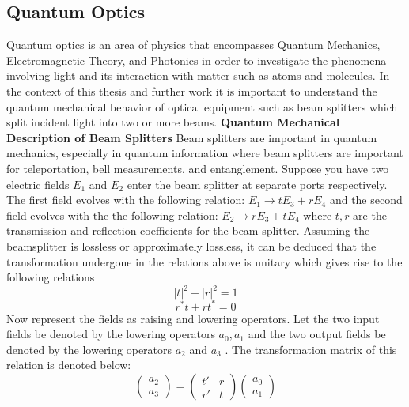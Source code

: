 \subsection{Quantum Optics}
Quantum optics is an area of physics that encompasses Quantum Mechanics, Electromagnetic Theory, and Photonics in order to investigate the phenomena involving light and its interaction with matter such as atoms and molecules. In the context of this thesis and further work it is important to understand the quantum mechanical behavior of optical equipment such as beam splitters which split incident light into two or more beams. \newline
\textbf{Quantum Mechanical Description of Beam Splitters} \newline
Beam splitters are important in quantum mechanics, especially in quantum information where beam splitters are important for teleportation, bell measurements, and entanglement. \newline
Suppose you have two electric fields $E_{1}$ and $E_{2}$ enter the beam splitter at separate ports respectively. The first field evolves with the following relation: $E_{1} \rightarrow tE_3 + rE_4$ and the second field evolves with the the following relation: $E_2 \rightarrow rE_3 + tE_4$ where $t,r$ are the transmission and reflection coefficients for the beam splitter. \newline \newline
Assuming the beamsplitter is lossless or approximately lossless, it can be deduced that the transformation undergone in the relations above is unitary which gives rise to the following relations
\begin{equation}
    |t|^2 + |r|^2 = 1
\end{equation}
\begin{equation}
    r^{*}t + rt^{*} = 0
\end{equation} 
Now represent the fields as raising and lowering operators. Let the two input fields be denoted by the lowering operators $a_{0} , a_{1}$ and the two output fields be denoted by the lowering operators $a_{2}$ and $a_{3}$ \cite{gerry2005introductory}. The transformation matrix of this relation is denoted below:
\begin{equation}
    \begin{pmatrix} a_{2} \\ a_{3} \end{pmatrix} = \begin{pmatrix} t' & r \\ r' & t \end{pmatrix} 
    \begin{pmatrix} a_{0} \\ a_{1} \end{pmatrix}
\end{equation}
